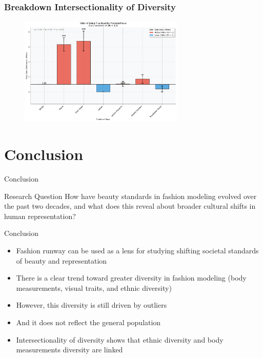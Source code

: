 \documentclass[aspectratio=169,xcolor=dvipsnames,10pt]{beamer}
\begin{document}
\begin{frame}[t]
    \frametitle{Breakdown Intersectionality of Diversity}
    \begin{figure}
            \begin{center}
            \includegraphics[width=0.7\textwidth]{figures/race_odds_ratio.png}
            \end{center}
        \end{figure}
\end{frame}

\section{Conclusion}

\begin{frame}{Conclusion}
   \pause \begin{exampleblock}{Research Question}
        How have beauty standards in fashion modeling evolved over the past two decades, and what does this reveal about broader cultural shifts in human representation?
    \end{exampleblock}
    \pause
    \begin{block}{Conclusion}
        \begin{itemize}{\setlength{\itemsep}{1em}}
            \pause \item Fashion runway can be used as a lens for studying shifting societal standards of beauty and representation
            \pause \item There is a clear trend toward greater diversity in fashion modeling (body measurements, visual traits, and ethnic diversity)
            \pause \item However, this diversity is still driven by outliers
            \pause \item And it does not reflect the general population
            \pause \item Intersectionality of diversity shows that ethnic diversity and body measurements diversity are linked
        \end{itemize}
    \end{block}
\end{frame}
\end{document}
